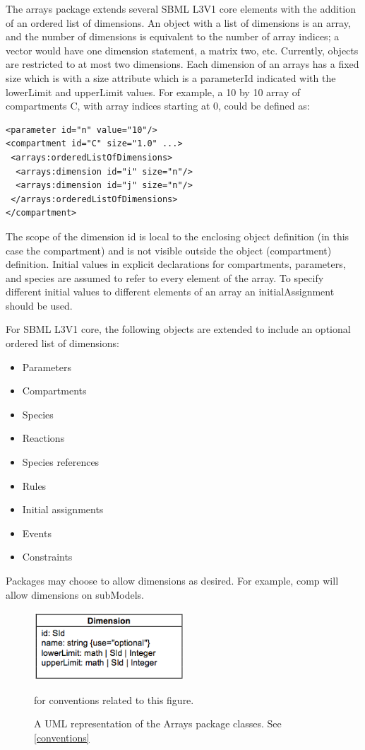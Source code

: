 The arrays package extends several SBML L3V1 core elements with the addition of an ordered list of dimensions.  An object with a list of dimensions is an array, and the number of dimensions is equivalent to the number of array indices; a vector would have one dimension statement, a matrix two, etc.  Currently, objects are restricted to at most two dimensions.  Each dimension of an arrays has a fixed size which is with a size attribute which is a parameterId indicated with the lowerLimit and upperLimit values.  For example, a 10 by 10 array of compartments C, with array indices starting at 0, could be defined as:
\begin{verbatim} 
<parameter id="n" value="10"/>
<compartment id="C" size="1.0" ...>
 <arrays:orderedListOfDimensions>
  <arrays:dimension id="i" size="n"/>
  <arrays:dimension id="j" size="n"/>
 </arrays:orderedListOfDimensions>
</compartment>
\end{verbatim}
The scope of the dimension id is local to the enclosing object definition  (in this case the compartment) and is not visible outside the object  (compartment) definition.  
Initial values in explicit declarations for compartments, parameters, and species are assumed to refer to every element of the array.  To specify different initial values to different elements of an array an initialAssignment should be used. 

For SBML L3V1 core, the following objects are extended to include an optional ordered list of dimensions:
\begin{itemize}
\item Parameters
\item Compartments
\item Species
\item Reactions
\item Species references
\item Rules
\item Initial assignments
\item Events
\item Constraints
\end{itemize}
Packages may choose to allow dimensions as desired.  For example, comp will allow dimensions on subModels.

\begin{figure}[h]
  \centering
  \includegraphics[width=0.5\textwidth]{images/arraysDef.png}\\
  \caption{A UML representation of the Arrays package classes. See \ref{conventions}} for conventions related to this figure. \label{fig:fbc_uml}
\end{figure}

